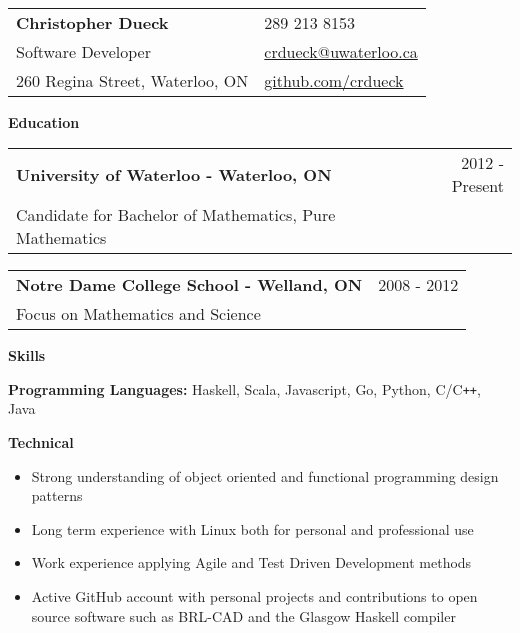 \documentclass[10pt]{article}
\makeatletter
\newcommand{\resheader}[6]{\
\begin{tabular*}{7in}{l@{\extracolsep{\fill}}l}
    \textbf{\huge #1} & {\large #2}
    \vspace{4pt} \\
    {\large #3} & {\large #4}
    \vspace{4pt} \\
    {\large #5} & {\large #6}
\end{tabular*}\vspace{4pt}}
\newcommand{\resheading}[1]{{\large \colorbox{headercol}{\begin{minipage}{\textwidth}{\textbf{#1 \vphantom{p\^{E}}}}\end{minipage}}}}
\newcommand{\ressubheading}[3]{\item
\begin{tabular*}{7in}{l@{\extracolsep{\fill}}r}
    \textbf{#1} & #2 \\ #3
\end{tabular*}\vspace{-4pt}}
\newcommand{\resitem}[2]{\item{\textbf{#1} #2}}
\newcommand{\phone}{{\Large\faPhone} 289 213 8153}
\newcommand{\email}{{\Large\faEnvelope} \href{mailto:crdueck@uwaterloo.ca}{crdueck@uwaterloo.ca}}
\newcommand{\github}{{\Large\faGithub} \href{https://github.com/crdueck}{github.com/crdueck}}
\makeatother
\begin{document}
\resheader
    {Christopher Dueck}                    \phone
    {Software Developer}                   \email
    {260 Regina Street, Waterloo, ON}      \github

\resheading{Education}
\begin{description}
    \ressubheading{University of Waterloo - Waterloo, ON} {2012 - Present}
    {Candidate for Bachelor of Mathematics, Pure Mathematics}
    \ressubheading{Notre Dame College School - Welland, ON} {2008 - 2012}
    {Focus on Mathematics and Science}
\end{description}

\resheading{Skills}
\begin{description}
    \resitem{Programming Languages:} {Haskell, Scala, Javascript, Go, Python, C/C\texttt{++}, Java}
    \resitem{Technical}{\vspace{-4pt}
    \begin{itemize}
            \item{Strong understanding of object oriented and functional programming design patterns}
            \item{Long term experience with Linux both for personal and professional use}
            \item{Work experience applying Agile and Test Driven Development methods}
            \item{Active GitHub account with personal projects and contributions to open source software such as BRL-CAD and the Glasgow Haskell compiler}
    \end{itemize}}
\end{description}
\end{document}
